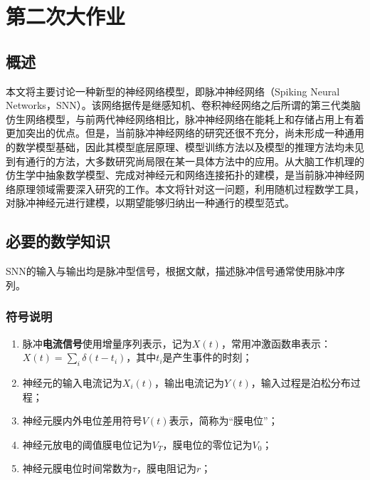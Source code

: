 \documentclass[11pt]{article}
\begin{document}
\section{第二次大作业}
\subsection{概述}
本文将主要讨论一种新型的神经网络模型，即脉冲神经网络（Spiking Neural Networks，SNN）。该网络据传是继感知机、卷积神经网络之后所谓的第三代类脑仿生网络模型，与前两代神经网络相比，脉冲神经网络在能耗上和存储占用上有着更加突出的优点。但是，当前脉冲神经网络的研究还很不充分，尚未形成一种通用的数学模型基础，因此其模型底层原理、模型训练方法以及模型的推理方法均未见到有通行的方法，大多数研究尚局限在某一具体方法中的应用。从大脑工作机理的仿生学中抽象数学模型、完成对神经元和网络连接拓扑的建模，是当前脉冲神经网络原理领域需要深入研究的工作。本文将针对这一问题，利用随机过程数学工具，对脉冲神经元进行建模，以期望能够归纳出一种通行的模型范式。
\subsection{必要的数学知识}
SNN的输入与输出均是脉冲型信号，根据文献\cite{jaegerEncyclopediaComputationalNeuroscience2015}，描述脉冲信号通常使用脉冲序列。
\subsubsection{符号说明}
\begin{enumerate}
  \item 脉冲\textbf{电流信号}使用增量序列表示，记为$X(t)$，常用冲激函数串表示：$X(t)=\sum_i\delta(t-t_i)$，其中$t_i$是产生事件的时刻；
  \item 神经元的输入电流记为$X_i(t)$，输出电流记为$Y(t)$，输入过程是泊松分布过程；
  \item 神经元膜内外电位差用符号$V(t)$表示，简称为“膜电位”；
  \item 神经元放电的阈值膜电位记为$V_T$，膜电位的零位记为$V_0$；
  \item 神经元膜电位时间常数为$\tau$，膜电阻记为$r$；
\end{enumerate}
\end{document}
